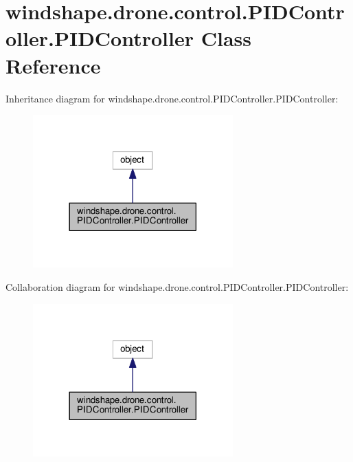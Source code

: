 \hypertarget{classwindshape_1_1drone_1_1control_1_1_p_i_d_controller_1_1_p_i_d_controller}{}\section{windshape.\+drone.\+control.\+P\+I\+D\+Controller.\+P\+I\+D\+Controller Class Reference}
\label{classwindshape_1_1drone_1_1control_1_1_p_i_d_controller_1_1_p_i_d_controller}


Inheritance diagram for windshape.\+drone.\+control.\+P\+I\+D\+Controller.\+P\+I\+D\+Controller\+:\nopagebreak
\begin{figure}[H]
\begin{center}
\leavevmode
\includegraphics[width=218pt]{classwindshape_1_1drone_1_1control_1_1_p_i_d_controller_1_1_p_i_d_controller__inherit__graph}
\end{center}
\end{figure}


Collaboration diagram for windshape.\+drone.\+control.\+P\+I\+D\+Controller.\+P\+I\+D\+Controller\+:\nopagebreak
\begin{figure}[H]
\begin{center}
\leavevmode
\includegraphics[width=218pt]{classwindshape_1_1drone_1_1control_1_1_p_i_d_controller_1_1_p_i_d_controller__coll__graph}
\end{center}
\end{figure}
